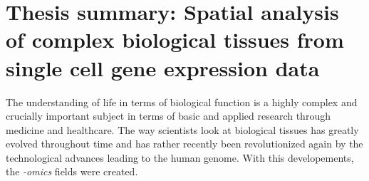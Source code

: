 \documentclass[a4paper,10pt]{article}
\title{}
\author{}
\begin{document}
\section*{Thesis summary: Spatial analysis of complex biological tissues from single cell gene expression data}
The understanding of life in terms of biological function is a highly complex and crucially important subject in terms of basic and applied research through medicine and healthcare. The way scientists look at biological tissues has greatly evolved throughout time and has rather recently  been revolutionized again by the technological advances leading to the human genome. With this developements, the \emph{-omics} fields were created.
\end{document}
